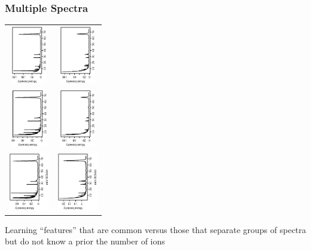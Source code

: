\documentclass[handout]{beamer}
\newcommand{\bs}[2]{\begin{frame} \frametitle{#1}
{#2}
\end{frame} }
\begin{document}
\bs{Multiple Spectra} {
\begin{center}
\begin{tabular}{cc}
\includegraphics[height=1in,angle=-90]{RawSpecCont_n4_allFrcAvg_22.ps}&
\includegraphics[height=1in,angle=-90]{RawSpecDis_n15_allFrcAvg_22.ps}\vspace{-.2in}\\
\includegraphics[height=1in,angle=-90]{RawSpecCont_n2_allFrcAvg_22.ps}&
\includegraphics[height=1in,angle=-90]{RawSpecDis_n14_allFrcAvg_22.ps}\vspace{-.2in}\\
\includegraphics[height=1in,angle=-90]{RawSpecCont_n1_allFrcAvg_22.ps}&
\includegraphics[height=1in,angle=-90]{RawSpecDis_n11_allFrcAvg_22.ps}
\end{tabular}
\end{center}

Learning ``features'' that are common versus those that separate
groups of  spectra but do not know a prior the number of ions
}
\end{document}
